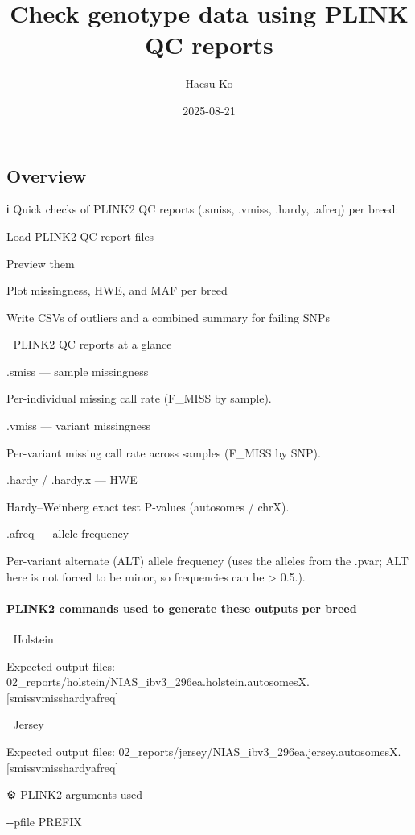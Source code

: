 \documentclass[
]{article}
\title{Check genotype data using PLINK QC reports}
\author{Haesu Ko}
\date{2025-08-21}
\begin{document}
\maketitle

\subsection{Overview}\label{overview}

{ℹ️} Quick checks of PLINK2 QC reports (.smiss, .vmiss, .hardy, .afreq)
per breed:

Load PLINK2 QC report files

Preview them

Plot missingness, HWE, and MAF per breed

Write CSVs of outliers and a combined summary for failing SNPs

📁 PLINK2 QC reports at a glance

.smiss --- sample missingness

Per-individual missing call rate (F\_MISS by sample).

.vmiss --- variant missingness

Per-variant missing call rate across samples (F\_MISS by SNP).

.hardy / .hardy.x --- HWE

Hardy--Weinberg exact test P-values (autosomes / chrX).

.afreq --- allele frequency

Per-variant alternate (ALT) allele frequency (uses the alleles from the
.pvar; ALT here is not forced to be minor, so frequencies can be
\textgreater{} 0.5.).

\paragraph{PLINK2 commands used to generate these outputs per
breed}\label{plink2-commands-used-to-generate-these-outputs-per-breed}

{🐄} Holstein

Expected output files:
02\_reports/holstein/NIAS\_ibv3\_296ea.holstein.autosomesX.{[}smiss\textbar vmiss\textbar hardy\textbar afreq{]}

{🧀} Jersey

Expected output files:
02\_reports/jersey/NIAS\_ibv3\_296ea.jersey.autosomesX.{[}smiss\textbar vmiss\textbar hardy\textbar afreq{]}

{⚙️} PLINK2 arguments used

-\/-pfile PREFIX
\end{document}
